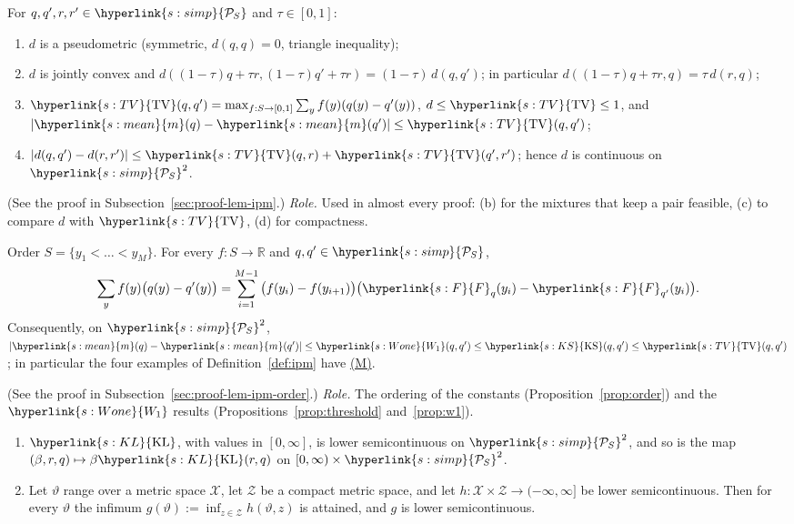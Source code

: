 \documentclass[11pt]{article}
\newcommand{\sy}[2]{{\hyperlink{#1}{#2}}}
\newcommand{\term}[2]{\hyperlink{#1}{#2}}
\newcommand{\Simp}{\sy{s:simp}{\mathcal{P}_{S}}}
\newcommand{\mean}{\sy{s:mean}{m}}
\newcommand{\Fd}{\sy{s:F}{F}}
\newcommand{\KL}{\sy{s:KL}{\mathrm{KL}}}
\newcommand{\TV}{\sy{s:TV}{\mathrm{TV}}}
\newcommand{\KSd}{\sy{s:KS}{\mathrm{KS}}}
\newcommand{\Wone}{\sy{s:Wone}{W_{1}}}
\newcommand{\propM}{\term{s:M}{(M)}}
\begin{document}
\begin{lemma}\label{lem:ipm}
For $q,q',r,r'\in\Simp$ and $\tau\in[0,1]$:
\begin{enumerate}
\item[(a)] $d$ is a pseudometric (symmetric, $d(q,q)=0$, triangle inequality);
\item[(b)] $d$ is jointly convex and $d((1-\tau)q+\tau r,(1-\tau)q'+\tau r)=(1-\tau)\,d(q,q')$; in
  particular $d((1-\tau)q+\tau r,q)=\tau\,d(r,q)$;
\item[(c)] $\TV(q,q')=\max_{f:S\to[0,1]}\sum_yf(y)(q(y)-q'(y))$, $d\le\TV\le1$, and
  $|\mean(q)-\mean(q')|\le\TV(q,q')$;
\item[(d)] $|d(q,q')-d(r,r')|\le\TV(q,r)+\TV(q',r')$; hence $d$ is continuous on $\Simp^2$.
\end{enumerate}
\end{lemma}

(See the proof in Subsection~\ref{sec:proof-lem-ipm}.) \emph{Role.} Used in almost every proof: (b)
for the mixtures that keep a pair feasible, (c) to compare $d$ with $\TV$, (d) for compactness.

\begin{lemma}\label{lem:ipm-order}
Order $S=\{y_1<\dots<y_M\}$. For every $f:S\to\mathbb R$ and $q,q'\in\Simp$,
\begin{equation*}
\sum_yf(y)\big(q(y)-q'(y)\big)=\sum_{i=1}^{M-1}\big(f(y_i)-f(y_{i+1})\big)\big(\Fd_q(y_i)-\Fd_{q'}(y_i)\big).
\end{equation*}
Consequently, on $\Simp^2$, $|\mean(q)-\mean(q')|\le \Wone(q,q')\le\KSd(q,q')\le\TV(q,q')$; in particular the
four examples of Definition~\ref{def:ipm} have \propM{}.
\end{lemma}

(See the proof in Subsection~\ref{sec:proof-lem-ipm-order}.) \emph{Role.} The ordering of the
constants (Proposition~\ref{prop:order}) and the $\Wone$ results (Propositions~\ref{prop:threshold}
and~\ref{prop:w1}).

\begin{lemma}\label{lem:lsc}
\begin{enumerate}
\item[(a)] $\KL$, with values in $[0,\infty]$, is lower semicontinuous on $\Simp^2$, and so is the
  map $(\beta,r,q)\mapsto\beta\KL(r,q)$ on $[0,\infty)\times\Simp^2$.
\item[(b)] Let $\vartheta$ range over a metric space $\mathcal X$, let $\mathcal Z$ be a compact
  metric space, and let $h:\mathcal X\times\mathcal Z\to(-\infty,\infty]$ be lower semicontinuous.
  Then for every $\vartheta$ the infimum $g(\vartheta):=\inf_{z\in\mathcal Z}h(\vartheta,z)$ is
  attained, and $g$ is lower semicontinuous.
\end{enumerate}
\end{lemma}
\end{document}
